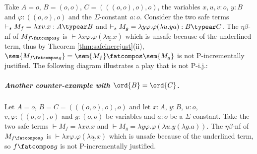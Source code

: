 Take $A=o$, $B=(o,o)$, $C=(((o,o),o),o)$, the variables
$x,u,v:o$, $y:B$ and $\varphi:((o,o),o)$ and the $\Sigma$-constant $a:o$. Consider the two safe terms $\vdash_s  M_f = \lambda xv.x : A\typear B$ and  $\vdash_s M_g = \lambda y \varphi. \varphi (\lambda u . y a) : B\typear C$.
The $\eta\beta$-nf of $M_{f\fatcompos g}$ is $\vdash \lambda x \varphi. \varphi (\underline{\lambda u . x})$ which is unsafe because of the underlined term, thus by Theorem \ref{thm:safeincrejust}(ii), $\sem{M_{f\fatcompos g}}=\sem{M_f} \fatcompos
\sem{M_g}$ is not P-incrementally justified. The following diagram illustrates a play that is not P-i.j.:

\begin{center}
\end{center}


\subparagraph{Another counter-example with $\ord{B} = \ord{C}$.}

Let $A=o$, $B=C=(((o,o),o),o)$ and let $x:A$, $y:B$, $u:o$, $v,\varphi:((o,o),o)$
and $g:(o,o)$ be variables and  $a:o$ be a $\Sigma$-constant. Take the two safe terms $\vdash  M_f = \lambda x v.x$ and $\vdash M_g = \lambda y \varphi. \varphi (\lambda u . y (\lambda g. a))$.
The $\eta\beta$-nf of $M_{f\fatcompos g}$ is $\vdash \lambda x \varphi. \varphi (\underline{\lambda u . x})$ which is unsafe because of the underlined term, so
$f\fatcompos g$ is not P-incrementally justified.



